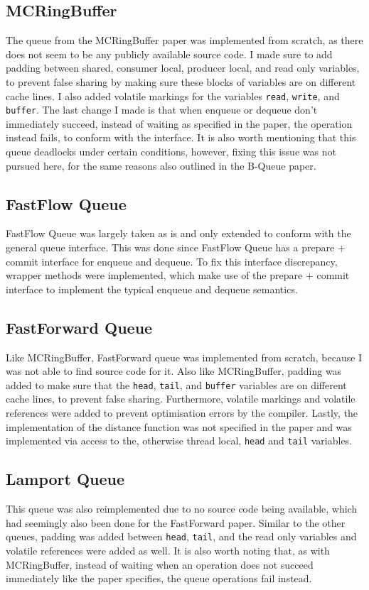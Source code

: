 \subsection{MCRingBuffer}
The queue from the MCRingBuffer paper was implemented from scratch, as there does not seem to be any publicly
available source code\cite{MCRingBuffer}.
I made sure to add padding between shared, consumer local, producer local, and read only variables, to
prevent false sharing by making sure these blocks of variables are on different cache lines.
I also added volatile markings for the variables \texttt{read}, \texttt{write}, and \texttt{buffer}.
The last change I made is that when enqueue or dequeue don't immediately succeed, instead of waiting as
specified in the paper, the operation instead fails, to conform with the interface\cite{MCRingBuffer}.
It is also worth mentioning that this queue deadlocks under certain conditions, however, fixing this issue
was not pursued here, for the same reasons also outlined in the B-Queue paper\cite{B-Queue}.

\subsection{FastFlow Queue}
FastFlow Queue was largely taken as is and only extended to conform with the general queue interface\cite{FastFlowGithub}.
This was done since FastFlow Queue has a prepare + commit interface for enqueue and dequeue.
To fix this interface discrepancy, wrapper methods were implemented, which make use of the prepare + commit
interface to implement the typical enqueue and dequeue semantics.

\subsection{FastForward Queue}
Like MCRingBuffer, FastForward queue was implemented from scratch, because I was not able to find source code for it\cite{FastForward}.
Also like MCRingBuffer, padding was added to make sure that the \texttt{head}, \texttt{tail}, and
\texttt{buffer} variables are on different cache lines, to prevent false sharing.
Furthermore, volatile markings and volatile references were added to prevent optimisation errors by the compiler.
Lastly, the implementation of the distance function was not specified in the paper and was implemented via
access to the, otherwise thread local, \texttt{head} and \texttt{tail} variables.

\subsection{Lamport Queue}
This queue was also reimplemented due to no source code being available, which had seemingly also been done
for the FastForward paper.
Similar to the other queues, padding was added between \texttt{head}, \texttt{tail}, and the read only
variables and volatile references were added as well.
It is also worth noting that, as with MCRingBuffer, instead of waiting when an operation does not succeed
immediately like the paper specifies, the queue operations fail instead\cite{Lamport}.
